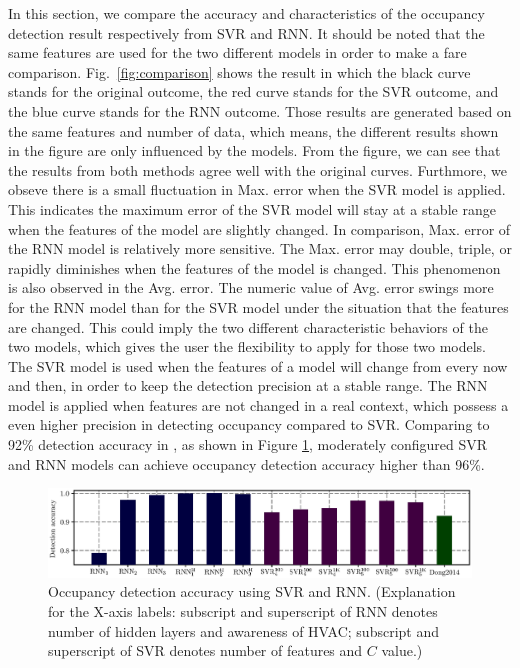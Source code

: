 \textcolor{feb18rev}{In this section, we compare the accuracy and characteristics of the
occupancy detection result respectively from SVR and RNN. It should be noted that the same
features are used for the two different models in order to make a fare comparison.}
Fig.~\ref{fig:comparison} shows the result in which the black curve
stands for the original outcome, the red curve stands for the SVR
outcome, and the blue curve stands for the RNN outcome.  Those results
are generated based on the same features and number of data, which
means, the different results shown in the figure are only influenced
by the models. From the figure, we can see that the results from both
methods agree well with the original curves.  Furthmore, we obseve
there is a small fluctuation in Max. error when the SVR model is
applied. This indicates the maximum error of the SVR model will stay
at a stable range when the features of the model are slightly
changed. In comparison, Max. error of the RNN model is relatively more
sensitive. The Max. error may double, triple, or rapidly diminishes
when the features of the model is changed. This phenomenon is also
observed in the Avg. error. The numeric value of Avg. error swings
more for the RNN model than for the SVR model under the situation that
the features are changed. This could imply the two different
characteristic behaviors of the two models, which gives the user the
flexibility to apply for those two models. The SVR model is used when
the features of a model will change from every now and then, in order
to keep the detection precision at a stable range. The RNN model is applied
when features are not changed in a real context, which possess a even higher
precision in detecting occupancy compared to SVR.
\textcolor{feb18rev}{Comparing to 92\% detection accuracy in \cite
{dong2014real}, as shown in Figure \ref{fig:accuracy-comparison}, moderately
configured SVR and RNN models can achieve occupancy detection accuracy higher
than 96\%.}

\begin{figure}[h]
    \centering
    \includegraphics[width=\textwidth]{./figs/results/results_compare.eps}
    \caption{\textcolor{feb18rev}{Occupancy detection accuracy using SVR and
    RNN. (Explanation for the X-axis labels: subscript and superscript of RNN
    denotes number of hidden layers and awareness of HVAC; subscript and
    superscript of SVR denotes number of features and $C$ value.)}}
    \label{fig:accuracy-comparison}
\end{figure}

